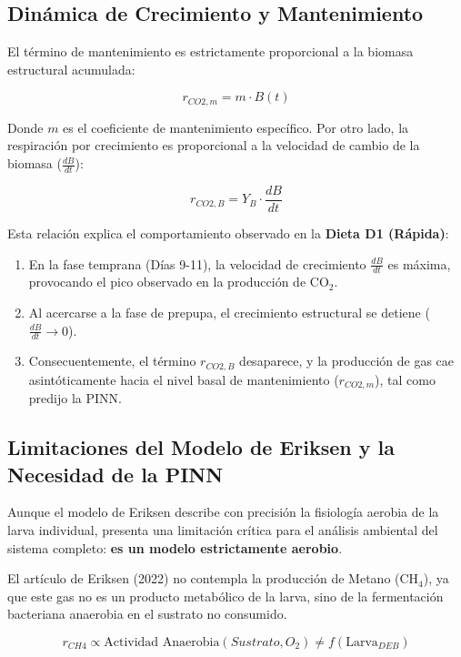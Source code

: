 \subsection{Dinámica de Crecimiento y Mantenimiento}

El término de mantenimiento es estrictamente proporcional a la biomasa estructural acumulada:

\begin{equation}
    r_{CO2,m} = m \cdot B(t)
\end{equation}

Donde $m$ es el coeficiente de mantenimiento específico. Por otro lado, la respiración por crecimiento es proporcional a la velocidad de cambio de la biomasa ($\frac{dB}{dt}$):

\begin{equation}
    r_{CO2,B} = Y_B \cdot \frac{dB}{dt}
\end{equation}

Esta relación explica el comportamiento observado en la \textbf{Dieta D1 (Rápida)}:
\begin{enumerate}
    \item En la fase temprana (Días 9-11), la velocidad de crecimiento $\frac{dB}{dt}$ es máxima, provocando el pico observado en la producción de CO$_2$.
    \item Al acercarse a la fase de prepupa, el crecimiento estructural se detiene ($\frac{dB}{dt} \to 0$).
    \item Consecuentemente, el término $r_{CO2,B}$ desaparece, y la producción de gas cae asintóticamente hacia el nivel basal de mantenimiento ($r_{CO2,m}$), tal como predijo la PINN.
\end{enumerate}

\subsection{Limitaciones del Modelo de Eriksen y la Necesidad de la PINN}

Aunque el modelo de Eriksen describe con precisión la fisiología aerobia de la larva individual, presenta una limitación crítica para el análisis ambiental del sistema completo: \textbf{es un modelo estrictamente aerobio}.

El artículo de Eriksen (2022) no contempla la producción de Metano (CH$_4$), ya que este gas no es un producto metabólico de la larva, sino de la fermentación bacteriana anaerobia en el sustrato no consumido.

\begin{equation}
    r_{CH4} \propto \text{Actividad Anaerobia}(Sustrato, O_2) \neq f(\text{Larva}_{DEB})
\end{equation}

